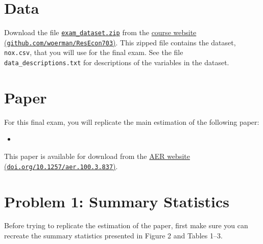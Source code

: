 \documentclass[11pt,letterpaper]{article}
\begin{document}
\section*{Data}

Download the file \href{https://github.com/woerman/ResEcon703/blob/master/exam/exam_dataset.zip}{\texttt{exam\_dataset.zip}} from the \href{https://github.com/woerman/ResEcon703}{course website (\texttt{github.com/woerman/ResEcon703})}. This zipped file contains the dataset, \texttt{nox.csv}, that you will use for the final exam. See the file \texttt{data\_descriptions.txt} for descriptions of the variables in the dataset.

\section*{Paper}

For this final exam, you will replicate the main estimation of the following paper:
\begin{itemize}[label={}, leftmargin=*]
	\item {}
\end{itemize}
This paper is available for download from the \href{https://doi.org/10.1257/aer.100.3.837}{AER website (\texttt{doi.org/10.1257/aer.100.3.837})}.

\section*{Problem 1: Summary Statistics}

Before trying to replicate the estimation of the paper, first make sure you can recreate the summary statistics presented in Figure 2 and Tables 1--3.
\end{document}
